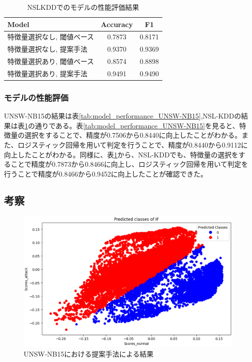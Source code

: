 \documentclass{css}
\begin{document}
\begin{table}[ht]
    \caption{NSLKDDでのモデルの性能評価結果}
    \centering
    \footnotesize
    \begin{tabular}{lcc}
        \hline\hline
        Model & Accuracy & F1 \\
        \hline
        特徴量選択なし, 閾値ベース& 0.7873 & 0.8171 \\
        特徴量選択なし, 提案手法 & 0.9370 & 0.9369 \\ 
        特徴量選択あり, 閾値ベース& 0.8574 & 0.8898 \\
        特徴量選択あり, 提案手法 & 0.9491 & 0.9490 \\
        \hline
    \end{tabular}
    \label{tab:model_performance_NSL-KDD}
\end{table}

\subsubsection{モデルの性能評価}
UNSW-NB15の結果は表\ref{tab:model_performance_UNSW-NB15},NSL-KDDの結果は表\ref{tab:model_performance_NSL-KDD}の通りである。表\ref{tab:model_performance_UNSW-NB15}を見ると、特徴量の選択をすることで、精度が0.7506から0.8440に向上したことがわかる。また、ロジスティック回帰を用いて判定を行うことで、精度が0.8440から0.9112に向上したことがわかる。同様に、表\ref{tab:model_performance_NSL-KDD}から、NSL-KDDでも、特徴量の選択をすることで精度が0.7873から0.8466に向上し、ロジスティック回帰を用いて判定を行うことで精度が0.8466から0.9452に向上したことが確認できた。

\subsection{考察}

\begin{figure}[ht]
    \centering
    \includegraphics[width=\linewidth]{pictures/eps/UNSW-NB153.eps}
    \caption{UNSW-NB15における提案手法による結果}
    \label{fig:UNSW-NB153}
\end{figure}
\end{document}
